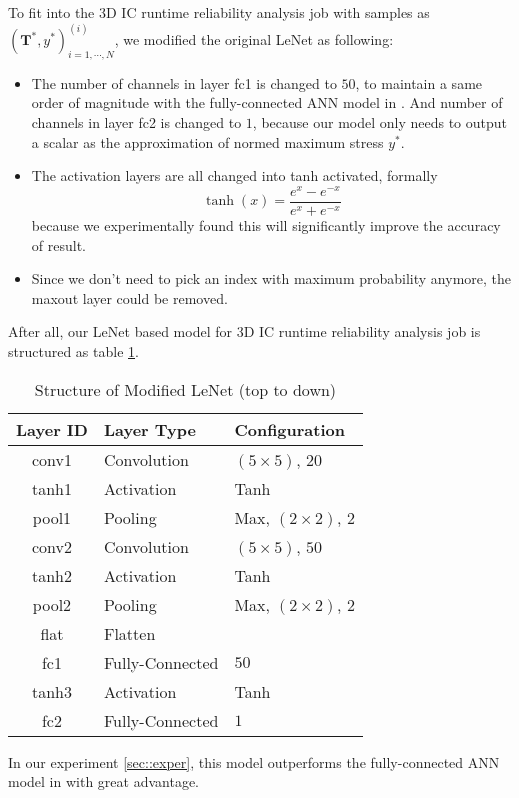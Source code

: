 To fit into the 3D IC runtime reliability analysis job with samples as 
$\left(\mathbf{T}^*, y^*\right)^{(i)}_{i=1,\cdots, N}$,
we modified the original LeNet as following:
\begin{itemize}
    \item The number of channels in layer fc1 is changed to $50$, to maintain a same order of magnitude
    with the fully-connected ANN model in \cite{Zhang2016Fast}. 
    And number of channels in layer fc2 is changed to $1$, because our model
    only needs to output a scalar as the approximation of normed maximum stress $y ^ *$.
    \item The activation layers are all changed into tanh activated, formally
    \begin{equation}
    \tanh (x) = \frac{e^x - e^{-x}}{e^x + e^{-x}}
    \end{equation}
    because we experimentally found this will significantly improve the accuracy of result.
    \item Since we don't need to pick an index with maximum probability anymore, the maxout
    layer could be removed.
\end{itemize}
After all, our LeNet based model for 3D IC runtime reliability analysis job is structured as table \ref{tab::LeNet'}.
\begin{table}[htb]
    \centering
    \caption{Structure of Modified LeNet (top to down)}
    \label{tab::LeNet'}
    \begin{tabular}{cll}
        \toprule
        Layer ID & Layer Type & Configuration \\
        \midrule
        conv1 & Convolution & $\left(5\times5\right)$, $20$ \\
        tanh1  & Activation  & Tanh \\
        pool1 & Pooling     & Max, $\left(2\times2\right)$, $2$ \\
        conv2 & Convolution & $\left(5\times5\right)$, $50$ \\
        tanh2  & Activation  & Tanh \\
        pool2 & Pooling     & Max, $\left(2\times2\right)$, $2$ \\
        flat  & Flatten     & \\
        fc1   & Fully-Connected & $50$ \\
        tanh3  & Activation  & Tanh \\
        fc2   & Fully-Connected & $1$ \\
        \bottomrule
    \end{tabular}
\end{table}
In our experiment \ref{sec::exper}, this model outperforms the fully-connected ANN model in \cite{Zhang2016Fast}
with great advantage.

